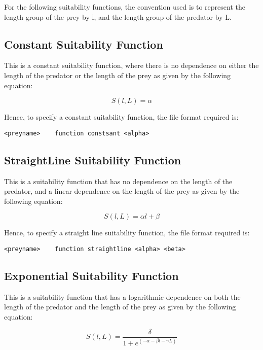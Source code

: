 \documentclass[10pt,twoside]{book}
\begin{document}
\bigskip
For the following suitability functions, the convention used is to represent the length group of the prey by l, and the length group of the predator by L.

\subsection{Constant Suitability Function}
This is a constant suitability function, where there is no dependence on either the length of the predator or the length of the prey as given by the following equation:

\begin{equation}\label{eq:constsuit}
S(l, L) = \alpha
\end{equation}

Hence, to specify a constant suitability function, the file format required is:

{\small\begin{verbatim}
<preyname>    function constsant <alpha>
\end{verbatim}}

\subsection{StraightLine Suitability Function}
This is a suitability function that has no dependence on the length of the predator, and a linear dependence on the length of the prey as given by the following equation:

\begin{equation}\label{eq:straightsuit}
S(l, L) = \alpha l + \beta
\end{equation}

Hence, to specify a straight line suitability function, the file format required is:

{\small\begin{verbatim}
<preyname>    function straightline <alpha> <beta>
\end{verbatim}}

\subsection{Exponential Suitability Function}
This is a suitability function that has a logarithmic dependence on both the length of the predator and the length of the prey as given by the following equation:

\begin{equation}\label{eq:expsuit}
S(l, L) = {\frac{\delta}{1 + e^{(- \alpha - \beta l - \gamma  L)}}}
\end{equation}
\end{document}
